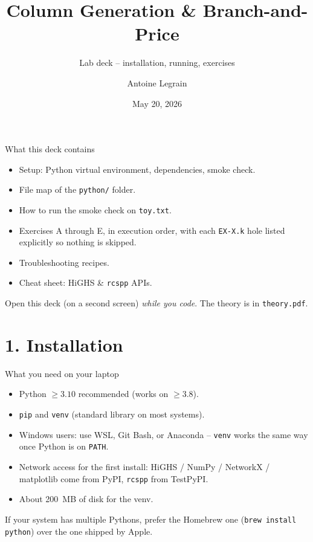 \documentclass[10pt,aspectratio=169]{beamer}
\title{Column Generation \& Branch-and-Price}
\subtitle{Lab deck -- installation, running, exercises}
\author{Antoine Legrain}
\institute{Polytechnique Montr\'eal}
\date{May 20, 2026}
\begin{document}
\begin{frame}\titlepage\end{frame}

\begin{frame}{What this deck contains}
  \begin{itemize}\setlength{\itemsep}{4pt}
    \item Setup: Python virtual environment, dependencies, smoke check.
    \item File map of the \texttt{python/} folder.
    \item How to run the smoke check on \texttt{toy.txt}.
    \item Exercises A through E, in execution order, with each \texttt{EX-X.k}
          hole listed explicitly so nothing is skipped.
    \item Troubleshooting recipes.
    \item Cheat sheet: HiGHS \& \texttt{rcspp} APIs.
  \end{itemize}
  \vfill
  Open this deck (on a second screen) \emph{while you code}. The theory is in
  \texttt{theory.pdf}.
\end{frame}

\section{1. Installation}

\begin{frame}[fragile]{What you need on your laptop}
  \begin{itemize}\small
    \item Python $\ge 3.10$ recommended (works on $\ge 3.8$).
    \item \texttt{pip} and \texttt{venv} (standard library on most systems).
    \item \alert{Windows users}: use WSL, Git Bash, or Anaconda --
          \texttt{venv} works the same way once Python is on \texttt{PATH}.
    \item Network access for the first install: HiGHS / NumPy / NetworkX /
          matplotlib come from PyPI, \texttt{rcspp} from TestPyPI.
    \item About 200~MB of disk for the venv.
  \end{itemize}
  \medskip
  \begin{tipbox}
    If your system has multiple Pythons, prefer the Homebrew one
    (\texttt{brew install python}) over the one shipped by Apple.
  \end{tipbox}
\end{frame}
\end{document}
